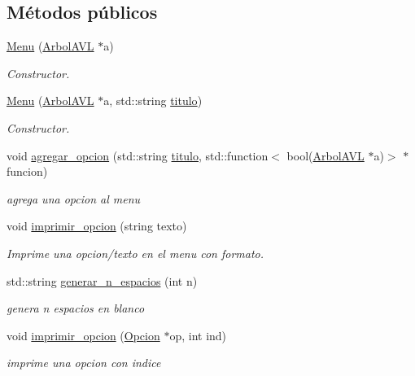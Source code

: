\subsection*{Métodos públicos}
\begin{DoxyCompactItemize}
\item 
\hyperlink{classMenu_a6d615b4b49c03a0cbfc2a01cfae8a64f}{Menu} (\hyperlink{classArbolAVL}{Arbol\+A\+VL} $\ast$a)
\begin{DoxyCompactList}\small\item\em Constructor. \end{DoxyCompactList}\item 
\hyperlink{classMenu_ad673482d111ee4a4d918653df02369e3}{Menu} (\hyperlink{classArbolAVL}{Arbol\+A\+VL} $\ast$a, std\+::string \hyperlink{classMenu_a16f1a749e7d6f35d9c1b4b7ae93b204f}{titulo})
\begin{DoxyCompactList}\small\item\em Constructor. \end{DoxyCompactList}\item 
void \hyperlink{classMenu_a1e1f674058f3fd03a500859abda7dded}{agregar\+\_\+opcion} (std\+::string \hyperlink{classMenu_a16f1a749e7d6f35d9c1b4b7ae93b204f}{titulo}, std\+::function$<$ bool(\hyperlink{classArbolAVL}{Arbol\+A\+VL} $\ast$a)$>$ $\ast$funcion)
\begin{DoxyCompactList}\small\item\em agrega una opcion al menu \end{DoxyCompactList}\item 
void \hyperlink{classMenu_aa964e3e58eb5c6b63ebadd7f2ec6751a}{imprimir\+\_\+opcion} (string texto)
\begin{DoxyCompactList}\small\item\em Imprime una opcion/texto en el menu con formato. \end{DoxyCompactList}\item 
std\+::string \hyperlink{classMenu_a67ebd3e3bcfe45c99a7c0ff13a5c3ebb}{generar\+\_\+n\+\_\+espacios} (int n)
\begin{DoxyCompactList}\small\item\em genera n espacios en blanco \end{DoxyCompactList}\item 
\mbox{\label{classMenu_ab0d231cb7a3783451bd690612ff0f77a}} 
void \hyperlink{classMenu_ab0d231cb7a3783451bd690612ff0f77a}{imprimir\+\_\+opcion} (\hyperlink{classOpcion}{Opcion} $\ast$op, int ind)
\begin{DoxyCompactList}\small\item\em imprime una opcion con indice \end{DoxyCompactList}\item 

\end{DoxyCompactItemize}
